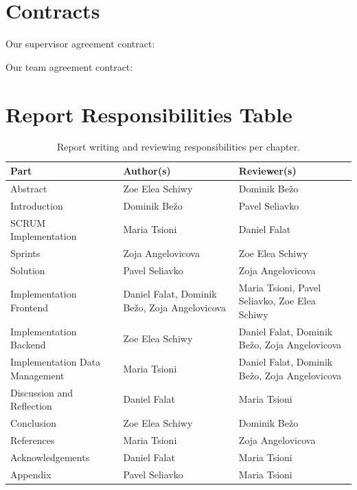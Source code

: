 \chapter{Contracts}
Our supervisor agreement contract:

\newpage

Our team agreement contract:

\newpage

\chapter{Report Responsibilities Table}
\label{sec:report-responsibilities}
\begin{table}[htbp]
    \centering
    \caption{Report writing and reviewing responsibilities per chapter.}
    \label{tab:report-responsibilities}
    \begin{tabular}{|p{5cm}|p{5cm}|p{5cm}|}
        \hline
        Part & Author(s) & Reviewer(s) \\ \hline \hline
        Abstract & Zoe Elea Schiwy & Dominik Bežo \\ \hline
        Introduction & Dominik Bežo & Pavel Seliavko \\ \hline
        SCRUM Implementation & Maria Tsioni & Daniel Falat \\ \hline
        Sprints & Zoja Angelovicova & Zoe Elea Schiwy \\ \hline
        Solution & Pavel Seliavko & Zoja Angelovicova \\ \hline
        Implementation Frontend & Daniel Falat, Dominik Bežo, Zoja Angelovicova & Maria Tsioni, Pavel Seliavko, Zoe Elea Schiwy \\ \hline
        Implementation Backend & Zoe Elea Schiwy & Daniel Falat, Dominik Bežo, Zoja Angelovicova \\ \hline
        Implementation Data Management & Maria Tsioni & Daniel Falat, Dominik Bežo, Zoja Angelovicova \\ \hline
        Discussion and Reflection & Daniel Falat & Maria  Tsioni \\ \hline
        Conclusion & Zoe Elea Schiwy & Dominik Bežo \\ \hline
        References & Maria Tsioni & Zoja Angelovicova \\ \hline
        Acknowledgements & Daniel Falat & Maria Tsioni \\ \hline
        Appendix & Pavel Seliavko & Maria Tsioni \\ \hline
    \end{tabular}
\end{table}
\newpage


